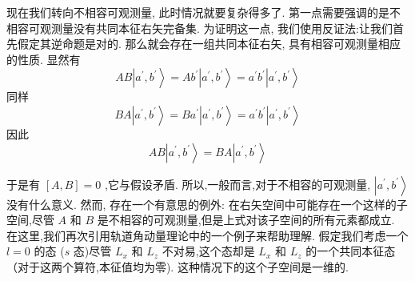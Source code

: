 	现在我们转向不相容可观测量, 此时情况就要复杂得多了. 第一点需要强调的是不相容可观测量没有共同本征右矢完备集. 为证明这一点, 我们使用反证法:让我们首先假定其逆命题是对的. 那么就会存在一组共同本征右矢, 具有相容可观测量相应的性质. 显然有
	\begin{equation}
		{AB}\left| {{a}^{\prime },{b}^{\prime }}\right\rangle = A{b}^{\prime }\left| {{a}^{\prime },{b}^{\prime }}\right\rangle = {a}^{\prime }{b}^{\prime }\left| {{a}^{\prime },{b}^{\prime }}\right\rangle
	\end{equation}
	同样
	\begin{equation}
		{BA}\left| {{a}^{\prime },{b}^{\prime }}\right\rangle = B{a}^{\prime }\left| {{a}^{\prime },{b}^{\prime }}\right\rangle = {a}^{\prime }{b}^{\prime }\left| {{a}^{\prime },{b}^{\prime }}\right\rangle
	\end{equation}
	因此
	\begin{equation}
		{AB}\left| {{a}^{\prime },{b}^{\prime }}\right\rangle = {BA}\left| {{a}^{\prime },{b}^{\prime }}\right\rangle
	\end{equation}
	
	于是有 $\left\lbrack {A, B}\right\rbrack = 0$ ,它与假设矛盾. 所以,一般而言,对于不相容的可观测量, $\left| {{a}^{\prime },{b}^{\prime }}\right\rangle$ 没有什么意义. 然而, 存在一个有意思的例外: 在右矢空间中可能存在一个这样的子空间,尽管 $A$ 和 $B$ 是不相容的可观测量,但是上式对该子空间的所有元素都成立. 在这里,我们再次引用轨道角动量理论中的一个例子来帮助理解. 假定我们考虑一个 $l = 0$ 的态 ($s$ 态)尽管 ${L}_{x}$ 和 ${L}_{z}$ 不对易,这个态却是 ${L}_{x}$ 和 ${L}_{z}$ 的一个共同本征态（对于这两个算符,本征值均为零). 这种情况下的这个子空间是一维的.
